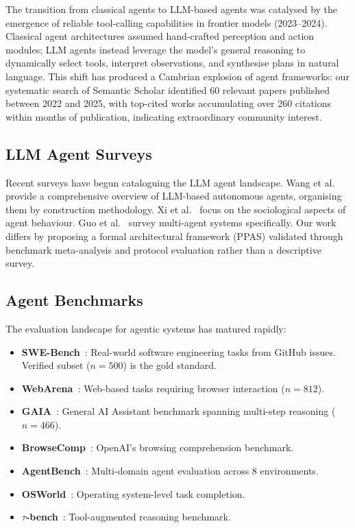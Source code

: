 \documentclass[12pt, a4paper]{article}
\begin{document}
The transition from classical agents to LLM-based agents was catalysed by the emergence of reliable tool-calling capabilities in frontier models (2023--2024). Classical agent architectures assumed hand-crafted perception and action modules; LLM agents instead leverage the model's general reasoning to dynamically select tools, interpret observations, and synthesise plans in natural language. This shift has produced a Cambrian explosion of agent frameworks: our systematic search of Semantic Scholar identified 60 relevant papers published between 2022 and 2025, with top-cited works accumulating over 260 citations within months of publication, indicating extraordinary community interest.

\subsection{LLM Agent Surveys}
Recent surveys have begun cataloguing the LLM agent landscape. Wang et al.~\citep{wang2024survey} provide a comprehensive overview of LLM-based autonomous agents, organising them by construction methodology. Xi et al.~\citep{xi2023rise} focus on the sociological aspects of agent behaviour. Guo et al.~\citep{guo2024llm} survey multi-agent systems specifically. Our work differs by proposing a formal architectural framework (PPAS) validated through benchmark meta-analysis and protocol evaluation rather than a descriptive survey.

\subsection{Agent Benchmarks}
The evaluation landscape for agentic systems has matured rapidly:
\begin{itemize}
    \item \textbf{SWE-Bench}~\citep{jimenez2024swebench}: Real-world software engineering tasks from GitHub issues. Verified subset ($n=500$) is the gold standard.
    \item \textbf{WebArena}~\citep{zhou2024webarena}: Web-based tasks requiring browser interaction ($n=812$).
    \item \textbf{GAIA}~\citep{mialon2023gaia}: General AI Assistant benchmark spanning multi-step reasoning ($n=466$).
    \item \textbf{BrowseComp}~\citep{openai2025browsecomp}: OpenAI's browsing comprehension benchmark.
    \item \textbf{AgentBench}~\citep{liu2024agentbench}: Multi-domain agent evaluation across 8 environments.
    \item \textbf{OSWorld}~\citep{xie2024osworld}: Operating system-level task completion.
    \item \textbf{$\tau$-bench}~\citep{yao2024tau}: Tool-augmented reasoning benchmark.
\end{itemize}
\end{document}
